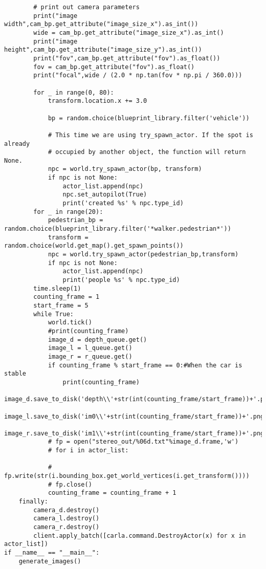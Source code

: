 \begin{verbatim}
        # print out camera parameters
        print("image width",cam_bp.get_attribute("image_size_x").as_int())
        wide = cam_bp.get_attribute("image_size_x").as_int()
        print("image height",cam_bp.get_attribute("image_size_y").as_int())
        print("fov",cam_bp.get_attribute("fov").as_float())
        fov = cam_bp.get_attribute("fov").as_float()
        print("focal",wide / (2.0 * np.tan(fov * np.pi / 360.0)))

        for _ in range(0, 80):
            transform.location.x += 3.0

            bp = random.choice(blueprint_library.filter('vehicle'))

            # This time we are using try_spawn_actor. If the spot is already
            # occupied by another object, the function will return None.
            npc = world.try_spawn_actor(bp, transform)
            if npc is not None:
                actor_list.append(npc)
                npc.set_autopilot(True)
                print('created %s' % npc.type_id)
        for _ in range(20):
            pedestrian_bp = random.choice(blueprint_library.filter('*walker.pedestrian*'))
            transform = random.choice(world.get_map().get_spawn_points())
            npc = world.try_spawn_actor(pedestrian_bp,transform)
            if npc is not None:
                actor_list.append(npc)
                print('people %s' % npc.type_id)
        time.sleep(1)
        counting_frame = 1
        start_frame = 5
        while True:
            world.tick()
            #print(counting_frame)
            image_d = depth_queue.get()
            image_l = l_queue.get()
            image_r = r_queue.get()            
            if counting_frame % start_frame == 0:#When the car is stable
                print(counting_frame)
                image_d.save_to_disk('depth\\'+str(int(counting_frame/start_frame))+'.png')
                image_l.save_to_disk('im0\\'+str(int(counting_frame/start_frame))+'.png')
                image_r.save_to_disk('im1\\'+str(int(counting_frame/start_frame))+'.png')
            # fp = open("stereo_out/%06d.txt"%image_d.frame,'w')    
            # for i in actor_list:
            
            #     fp.write(str(i.bounding_box.get_world_vertices(i.get_transform())))
            # fp.close()
            counting_frame = counting_frame + 1
    finally:
        camera_d.destroy()
        camera_l.destroy()
        camera_r.destroy()
        client.apply_batch([carla.command.DestroyActor(x) for x in actor_list])
if __name__ == "__main__":
    generate_images()
\end{verbatim}
